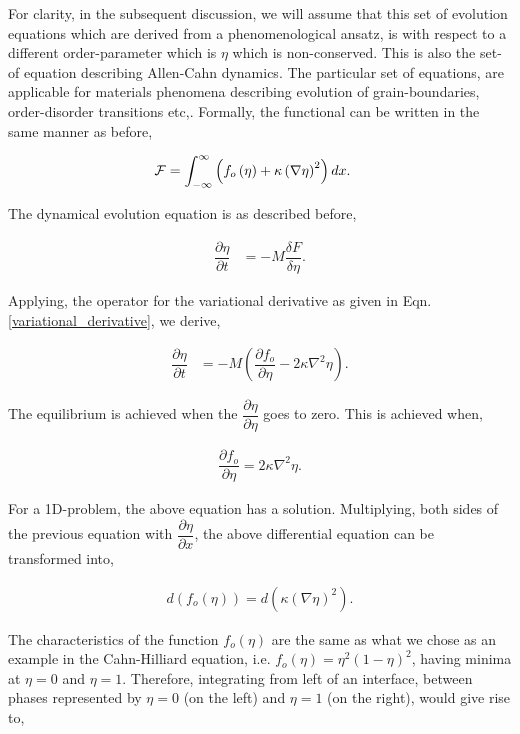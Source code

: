 \documentclass[english]{iambook}
\begin{document}
For clarity, in the subsequent discussion, we will assume that this 
set of evolution equations which are derived from a phenomenological ansatz, 
is with respect to a different order-parameter which is $\eta$ which is
non-conserved. This is also the set-of equation describing Allen-Cahn 
dynamics. The particular set of equations, are applicable for materials
phenomena describing evolution of grain-boundaries, order-disorder transitions
etc,. Formally, the functional can be written in the same manner as
before, 

\begin{align}
 {\cal F} &= \int_{-\infty}^{\infty}\left(f_o\left(\eta\right) + \kappa\left(\nabla \eta\right)^{2}\right) dx.
\end{align}

The dynamical evolution equation is as described before, 

\begin{align}
 \dfrac{\partial \eta}{\partial t} &= -M \dfrac{\delta F}{\delta \eta}.
\end{align}

Applying, the operator for the variational derivative as given in Eqn.\ref{variational_derivative},
we derive, 

\begin{align}
 \dfrac{\partial \eta}{\partial t} &= -M \left(\dfrac{\partial f_o}{\partial \eta} - 2\kappa\nabla^{2}\eta\right).
\end{align}

The equilibrium is achieved when the $\dfrac{\partial \eta}{\partial \eta}$ 
goes to zero. This is achieved when, 

\begin{align}
 \dfrac{\partial f_o}{\partial \eta} = 2\kappa\nabla^{2}\eta.
\end{align}

For a 1D-problem, the above equation has a solution. Multiplying, 
both sides of the previous equation with $\dfrac{\partial \eta}{\partial x}$,
the above differential equation can be transformed into, 

\begin{align}
 d\left(f_o\left(\eta\right)\right) = d \left(\kappa \left(\nabla \eta\right)^{2}\right).
\end{align}

The characteristics of the function $f_o\left(\eta\right)$ are the same 
as what we chose as an example in the Cahn-Hilliard equation, i.e. 
$f_o\left(\eta\right)=\eta^{2}\left(1-\eta\right)^{2}$, having minima
at $\eta=0$ and $\eta=1$. Therefore, integrating from left of an interface, 
between phases represented by $\eta=0$ (on the left) and $\eta=1$ (on the right), 
would give rise to, 
\end{document}
